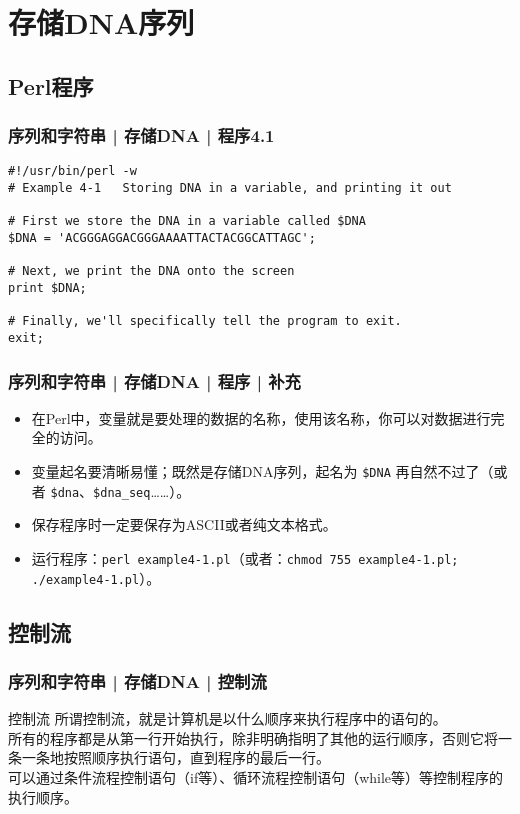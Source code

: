 \section{存储DNA序列}
\subsection{Perl程序}
\begin{frame}[fragile,label=exam4.1]
  \frametitle{序列和字符串 | 存储DNA | \alert{程序4.1}}
\begin{lstlisting}
#!/usr/bin/perl -w
# Example 4-1   Storing DNA in a variable, and printing it out

# First we store the DNA in a variable called $DNA
$DNA = 'ACGGGAGGACGGGAAAATTACTACGGCATTAGC';

# Next, we print the DNA onto the screen
print $DNA;

# Finally, we'll specifically tell the program to exit.
exit;
\end{lstlisting}
\end{frame}

\begin{frame}[fragile]
  \frametitle{序列和字符串 | 存储DNA | 程序 | \alert{补充}}
  \begin{itemize}
    \item 在Perl中，变量就是要处理的数据的名称，使用该名称，你可以对数据进行完全的访问。
    \item 变量起名要清晰易懂；既然是存储DNA序列，起名为 \verb|$DNA| 再自然不过了（或者 \verb|$dna|、\verb|$dna_seq|……）。
    \item 保存程序时一定要保存为ASCII或者纯文本格式。
    \item 运行程序：\verb|perl example4-1.pl|（或者：\verb|chmod 755 example4-1.pl; ./example4-1.pl|）。
  \end{itemize}
\end{frame}

\subsection{控制流}
\begin{frame}
  \frametitle{序列和字符串 | 存储DNA | 控制流}
  \begin{block}{控制流}
  所谓控制流，就是计算机是以什么顺序来执行程序中的语句的。\\
  \vspace{1em}
  所有的程序都是从第一行开始执行，除非明确指明了其他的运行顺序，否则它将一条一条地按照顺序执行语句，直到程序的最后一行。\\
  \vspace{1em}
  可以通过条件流程控制语句（if等）、循环流程控制语句（while等）等控制程序的执行顺序。
  \end{block}
\end{frame}

